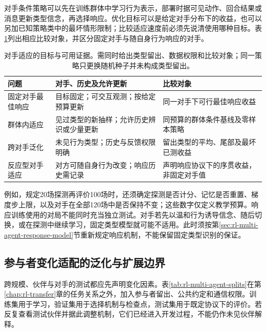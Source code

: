 对手条件策略可以先在训练群体中学习行为表示，部署时据可见动作、回合结果或消息更新类型信念，再选择响应。优化目标可以是给定对手分布下的收益，也可以另加已知策略类中的最坏情形限制；比较适应速度前必须先说清使用哪种目标。表\ref{tab:rl-multi-agent-opponent-adaptation}列出相应比较对象，并区分固定对手与随自身行为响应的对手。

\begin{table}[htbp]
 \centering
 \begin{tabularx}{\linewidth}{@{}l >{\raggedright\arraybackslash}X >{\raggedright\arraybackslash}X@{}}
 \toprule
 问题 & 对手、历史及允许更新 & 比较对象\\
 \midrule
 固定对手最佳响应 & 目标固定；可交互观测；按给定预算更新 & 同一对手下可行最佳响应收益\\
 群体内适应 & 见过类型的新抽样；允许历史辨识或少量更新 & 同预算的群体条件基线及零样本策略\\
 跨对手泛化 & 未见行为类型；历史与反馈权限明确 & 留出类型的平均、尾部及最坏已测收益\\
 反应型对手适应 & 对方可随自身行为改变；响应历史需记录 & 声明响应协议下的序贯收益，非固定对手值\\
 \bottomrule
 \end{tabularx}
 \caption{对手适应的目标与可用证据。需同时给出类型留出、数据权限和比较对象；同一策略只更换随机种子并未构成类型留出。}
 \label{tab:rl-multi-agent-opponent-adaptation}
\end{table}

例如，规定20场探测再评价100场时，还须确定探测是否计分、记忆是否重置、梯度步上限，以及对手在全部120场中是否保持不变；这些数字仅定义教学预算。响应训练使用的对局不能同时充当独立测试。对手若先以温和行为诱导信念、随后切换，或在探测中继续学习，固定类型模型就可能不适用。此时须按第\ref{sec:rl-multi-agent-response-model}节重新规定响应机制，不能保留固定类型识别的保证。

\subsection{参与者变化适配的泛化与扩展边界}
\label{sec:rl-multi-agent-generalization}

跨规模、伙伴与对手的测试都应先声明变化因素。表\ref{tab:rl-multi-agent-splits}在第\ref{chap:rl-transfer}章的任务关系之外，加入参与者留出、公共约定和通信权限。训练集用于学习，验证集用于选择机制与检查点，测试集用于既定协议下的评价。若反复查看测试伙伴并据此调整机制，它们已经进入开发过程，不能仍作未见伙伴解释。

